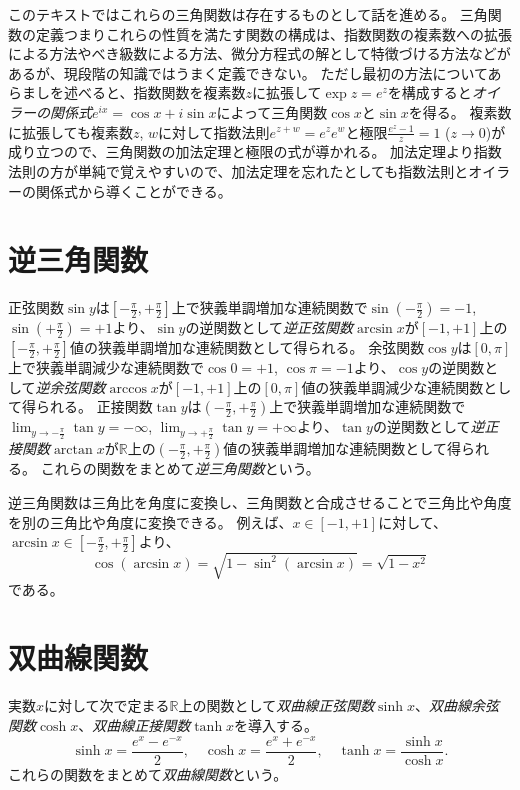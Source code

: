 このテキストではこれらの三角関数は存在するものとして話を進める。
三角関数の定義つまりこれらの性質を満たす関数の構成は、指数関数の複素数への拡張による方法やべき級数による方法、微分方程式の解として特徴づける方法などがあるが、現段階の知識ではうまく定義できない。
ただし最初の方法についてあらましを述べると、指数関数を複素数$z$に拡張して$\exp z = e^z$を構成すると\emph{オイラーの関係式}$e^{i x} = \cos x+i\sin x$によって三角関数$\cos x$と$\sin x$を得る。
複素数に拡張しても複素数$z$, $w$に対して指数法則$e^{z+w} = e^z e^w$と極限$\frac{e^z-1}{z} = 1$ ($z \to 0$)が成り立つので、三角関数の加法定理と極限の式が導かれる。
加法定理より指数法則の方が単純で覚えやすいので、加法定理を忘れたとしても指数法則とオイラーの関係式から導くことができる。

\section{逆三角関数}

正弦関数$\sin y$は$[-\frac{\pi}{2}, +\frac{\pi}{2}]$上で狭義単調増加な連続関数で$\sin(-\frac{\pi}{2}) = -1$, $\sin(+\frac{\pi}{2}) = +1$より、$\sin y$の逆関数として\emph{逆正弦関数}$\arcsin x$が$[-1, +1]$上の$[-\frac{\pi}{2}, +\frac{\pi}{2}]$値の狭義単調増加な連続関数として得られる。
余弦関数$\cos y$は$[0, \pi]$上で狭義単調減少な連続関数で$\cos 0 = +1$, $\cos \pi = -1$より、$\cos y$の逆関数として\emph{逆余弦関数}$\arccos x$が$[-1, +1]$上の$[0, \pi]$値の狭義単調減少な連続関数として得られる。
正接関数$\tan y$は$(-\frac{\pi}{2}, +\frac{\pi}{2})$上で狭義単調増加な連続関数で$\lim_{y \to -\frac{\pi}{2}}\tan y = -\infty$, $\lim_{y \to +\frac{\pi}{2}}\tan y = +\infty$より、$\tan y$の逆関数として\emph{逆正接関数}$\arctan x$が$\mathbb{R}$上の$(-\frac{\pi}{2}, +\frac{\pi}{2})$値の狭義単調増加な連続関数として得られる。
これらの関数をまとめて\emph{逆三角関数}という。

\begin{example}
逆三角関数は三角比を角度に変換し、三角関数と合成させることで三角比や角度を別の三角比や角度に変換できる。
例えば、$x \in [-1, +1]$に対して、$\arcsin x \in [-\frac{\pi}{2}, +\frac{\pi}{2}]$より、
$$
\cos(\arcsin x) = \sqrt{1-\sin^2(\arcsin x)} = \sqrt{1-x^2}
$$
である。
\end{example}

\section{双曲線関数}

実数$x$に対して次で定まる$\mathbb{R}$上の関数として\emph{双曲線正弦関数}$\sinh x$、\emph{双曲線余弦関数}$\cosh x$、\emph{双曲線正接関数}$\tanh x$を導入する。
$$
\sinh x = \frac{e^x-e^{-x}}{2}, \quad \cosh x = \frac{e^x+e^{-x}}{2}, \quad \tanh x = \frac{\sinh x}{\cosh x}.
$$
これらの関数をまとめて\emph{双曲線関数}という。

